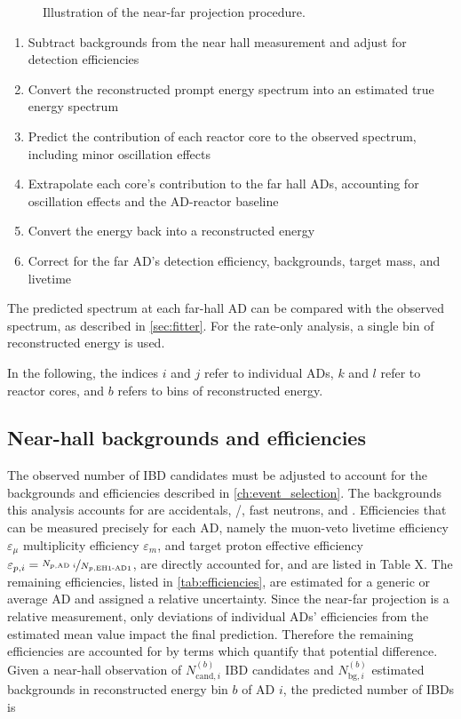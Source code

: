 \begin{figure}
    \caption{Illustration of the near-far projection procedure.}
    \label{fig:near_far_cartoon}
\end{figure}

\begin{enumerate}
    \item Subtract backgrounds from the near hall measurement
        and adjust for detection efficiencies
    \item Convert the reconstructed prompt energy spectrum
        into an estimated true \nuebar{} energy spectrum
    \item Predict the contribution of each reactor core
        to the observed \nuebar{} spectrum,
        including minor oscillation effects
    \item Extrapolate each core's contribution to the far hall ADs,
        accounting for oscillation effects and the AD-reactor baseline
    \item Convert the \nuebar{} energy back into a reconstructed energy
    \item Correct for the far AD's detection efficiency, backgrounds,
        target mass, and livetime
\end{enumerate}
The predicted spectrum at each far-hall AD can be compared
with the observed spectrum, as described in \cref{sec:fitter}.
For the rate-only analysis, a single bin of reconstructed energy is used.

In the following, the indices $i$ and $j$ refer to individual ADs,
$k$ and $l$ refer to reactor cores,
and $b$ refers to bins of reconstructed energy.

\subsection{Near-hall backgrounds and efficiencies}
\label{subsec:near_bg_eff}

The observed number of IBD candidates must be adjusted
to account for the backgrounds and efficiencies described in \cref{ch:event_selection}.
The backgrounds this analysis accounts for are
accidentals, \li{}/\he{}, fast neutrons, and \amc{}.
Efficiencies that can be measured precisely for each AD,
namely
the muon-veto livetime efficiency $\varepsilon_\mu$
multiplicity efficiency $\varepsilon_m$,
and target proton effective efficiency
$\varepsilon_{p,i}=\nicefrac{N_{p,\text{AD }i}}{N_{p,\text{EH1-AD1}}}$,
are directly accounted for,
and are listed in Table X.
The remaining efficiencies, listed in \cref{tab:efficiencies},
are estimated for a generic or average AD and assigned a relative uncertainty.
Since the near-far projection is a relative measurement,
only deviations of individual ADs' efficiencies from the estimated mean value
impact the final prediction.
Therefore the remaining efficiencies are accounted for
by terms which quantify that potential difference.
Given a near-hall observation of $N_{\text{cand},i}^{(b)}$ IBD candidates
and $N_{\text{bg},i}^{(b)}$ estimated backgrounds in reconstructed energy bin $b$
of AD $i$,
the predicted number of IBDs is

